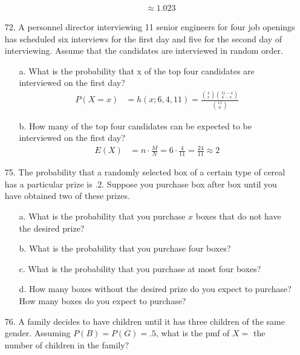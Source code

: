 \documentclass[letterpaper,12pt]{article}
\newcommand{\hg}[4]{%
  \frac%
    {\binom{#3}{#1} \binom{#4 - #3}{#2 - #1}}%
    {\binom{#4}{#2}}%
}
\newcommand{\hgeq}[4]{%
  h(#1; #2, #3, #4) = \hg{#1}{#2}{#3}{#4}%
}
\begin{document}
\begin{enumerate}
\begin{enumerate}
\begin{align*}
          &\approx 1.023
        \end{align*}
    \end{enumerate}
  \item[72.]
    A personnel director interviewing 11 senior engineers for four job openings has scheduled six interviews for the first day and five for the second day of interviewing. Assume that the candidates are interviewed in random order.
    \begin{enumerate}
      \item[a.]
        What is the probability that x of the top four candidates are interviewed on the first day?
        \begin{align*}
          P(X = x) &= \hgeq{x}{6}{4}{11}
        \end{align*}
      \item[b.]
        How many of the top four candidates can be expected to be interviewed on the first day?
        \begin{align*}
          E(X) &= n \cdot \frac{M}{N} = 6 \cdot \frac{4}{11} = \frac{24}{11} \approx 2
        \end{align*}
    \end{enumerate}
  \item[75.]
    The probability that a randomly selected box of a certain type of cereal has a particular prize is .2. Suppose you purchase box after box until you have obtained two of these prizes.
    \begin{enumerate}
      \item[a.]
        What is the probability that you purchase $x$ boxes that do not have the desired prize?
      \item[b.]
        What is the probability that you purchase four boxes?
      \item[c.]
        What is the probability that you purchase at most four boxes?
      \item[d.]
        How many boxes without the desired prize do you expect to purchase? How many boxes do you expect to purchase?
    \end{enumerate}
  \item[76.]
    A family decides to have children until it has three children of the same gender. Assuming $P(B) = P(G) = .5$, what is the pmf of $X =$ the number of children in the family?
\end{enumerate}
\end{document}
